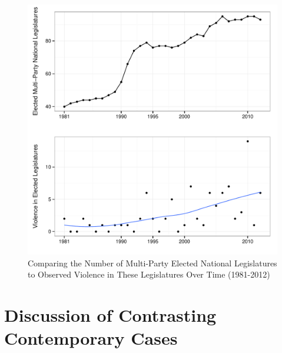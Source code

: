 \documentclass[a4paper]{article}\usepackage[]{graphicx}\usepackage[]{color}
\newenvironment{knitrout}{}{} %
\begin{document}
\begin{figure}

    \begin{center}
\begin{knitrout}
\color{fgcolor}
\includegraphics[width=0.8\linewidth]{figure/compareLegToViolence-1} 

\end{knitrout}
    \end{center}

    \caption{Comparing the Number of Multi-Party Elected National Legislatures to Observed Violence in These Legislatures Over Time (1981-2012)}
    \label{elect_vs_violence}

\end{figure}

\section*{Discussion of Contrasting Contemporary Cases}

\end{document}
